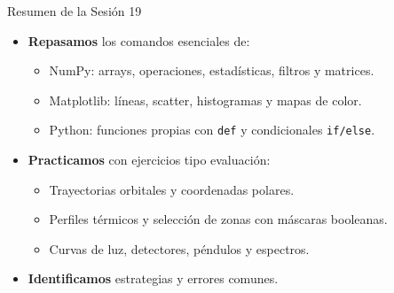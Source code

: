 \documentclass[10pt]{beamer}
\begin{document}
\begin{frame}{Resumen de la Sesión 19}
  \begin{itemize}
    \item \textbf{Repasamos} los comandos esenciales de:
      \begin{itemize}
        \item NumPy: arrays, operaciones, estadísticas, filtros y matrices.
        \item Matplotlib: líneas, scatter, histogramas y mapas de color.
        \item Python: funciones propias con \texttt{def} y condicionales \texttt{if/else}.
      \end{itemize}
    \item \textbf{Practicamos} con ejercicios tipo evaluación:
      \begin{itemize}
        \item Trayectorias orbitales y coordenadas polares.
        \item Perfiles térmicos y selección de zonas con máscaras booleanas.
        \item Curvas de luz, detectores, péndulos y espectros.
      \end{itemize}
    \item \textbf{Identificamos} estrategias y errores comunes.
  \end{itemize}
\end{frame}
\end{document}
